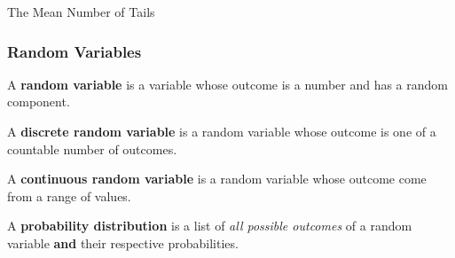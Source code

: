 \begin{frame}{The Mean Number of Tails}
  \vfill

\end{frame}

\begin{frame}
  \frametitle{Random Variables}

  \begin{definition}
    A \textbf{random variable} is a variable whose outcome is a number
    and has a random component.
  \end{definition}

  {
    \begin{definition}
      A \textbf{discrete random variable} is a random variable whose
      outcome is one of a countable number of outcomes.
    \end{definition}
  }

  {
    \begin{definition}
      A \textbf{continuous random variable} is a random variable whose
      outcome come from a range of values.
    \end{definition}
  }

  {
    \begin{definition}
      A \textbf{probability distribution} is a list of \textit{all
        possible outcomes} of a random variable \textbf{and} their
      respective probabilities.
    \end{definition}
  }

\end{frame}

